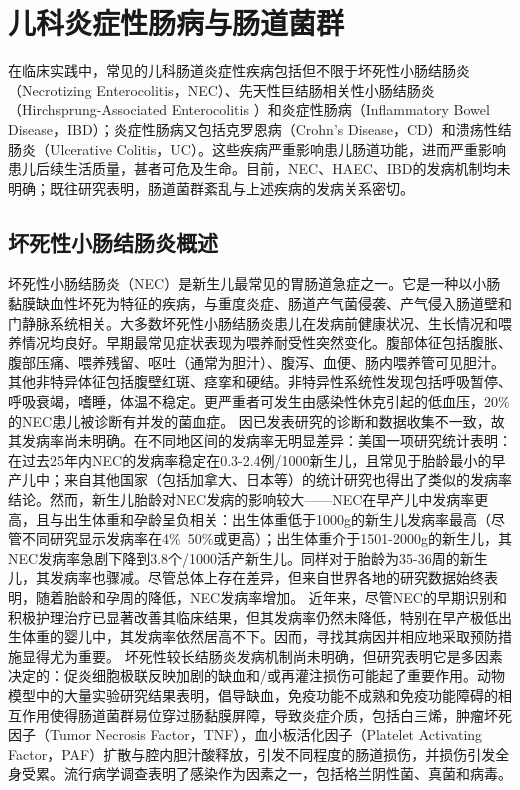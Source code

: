 \section{儿科炎症性肠病与肠道菌群}
\label{sec:enterocolitis}
在临床实践中，常见的儿科肠道炎症性疾病包括但不限于坏死性小肠结肠炎（Necrotizing Enterocolitis，NEC）、先天性巨结肠相关性小肠结肠炎（Hirchsprung-Associated Enterocolitis ）和炎症性肠病（Inflammatory Bowel Disease，IBD）；炎症性肠病又包括克罗恩病（Crohn’s Disease，CD）和溃疡性结肠炎（Ulcerative Colitis，UC）。这些疾病严重影响患儿肠道功能，进而严重影响患儿后续生活质量，甚者可危及生命。目前，NEC、HAEC、IBD的发病机制均未明确；既往研究表明，肠道菌群紊乱与上述疾病的发病关系密切。

\subsection{坏死性小肠结肠炎概述}
坏死性小肠结肠炎（NEC）是新生儿最常见的胃肠道急症之一。它是一种以小肠黏膜缺血性坏死为特征的疾病，与重度炎症、肠道产气菌侵袭、产气侵入肠道壁和门静脉系统相关\cite{neu2011necrotizing}。大多数坏死性小肠结肠炎患儿在发病前健康状况、生长情况和喂养情况均良好\cite{hallstrom2006laboratory}。早期最常见症状表现为喂养耐受性突然变化。腹部体征包括腹胀、腹部压痛、喂养残留、呕吐（通常为胆汁）、腹泻、血便、肠内喂养管可见胆汁\cite{walsh1988necrotizing, yu1980improving}。其他非特异体征包括腹壁红斑、痉挛和硬结。非特异性系统性发现包括呼吸暂停、呼吸衰竭，嗜睡，体温不稳定。更严重者可发生由感染性休克引起的低血压，20\%的NEC患儿被诊断有并发的菌血症\cite{kliegman1984necrotizing}。
因已发表研究的诊断和数据收集不一致，故其发病率尚未明确\cite{zani2015scavenger}。在不同地区间的发病率无明显差异：美国一项研究统计表明：在过去25年内NEC的发病率稳定在0.3-2.4例/1000新生儿，且常见于胎龄最小的早产儿中\cite{pickard2009short}；来自其他国家（包括加拿大、日本等）的统计研究也得出了类似的发病率结论\cite{kawase2006gastrointestinal}。然而，新生儿胎龄对NEC发病的影响较大——NEC在早产儿中发病率更高，且与出生体重和孕龄呈负相关：出生体重低于1000g的新生儿发病率最高（尽管不同研究显示发病率在4\%~50\%或更高）；出生体重介于1501-2000g的新生儿，其NEC发病率急剧下降到3.8个/1000活产新生儿\cite{stoll2015trends}。同样对于胎龄为35-36周的新生儿，其发病率也骤减。尽管总体上存在差异，但来自世界各地的研究数据始终表明，随着胎龄和孕周的降低，NEC发病率增加\cite{backhed2005host,rees2010national,yee2012incidence}。
近年来，尽管NEC的早期识别和积极护理治疗已显著改善其临床结果，但其发病率仍然未降低，特别在早产极低出生体重的婴儿中，其发病率依然居高不下。因而，寻找其病因并相应地采取预防措施显得尤为重要。
坏死性较长结肠炎发病机制尚未明确，但研究表明它是多因素决定的：促炎细胞极联反映加剧的缺血和/或再灌注损伤可能起了重要作用。动物模型中的大量实验研究结果表明，倡导缺血，免疫功能不成熟和免疫功能障碍的相互作用使得肠道菌群易位穿过肠黏膜屏障，导致炎症介质，包括白三烯，肿瘤坏死因子（Tumor Necrosis Factor，TNF），血小板活化因子（Platelet Activating Factor，PAF）扩散与腔内胆汁酸释放，引发不同程度的肠道损伤，并损伤引发全身受累\cite{good2015breast,miller1990casein}。流行病学调查表明了感染作为因素之一，包括格兰阴性菌、真菌和病毒\cite{de2004early,hodzic2017role,denning2017pathogenesis}。
